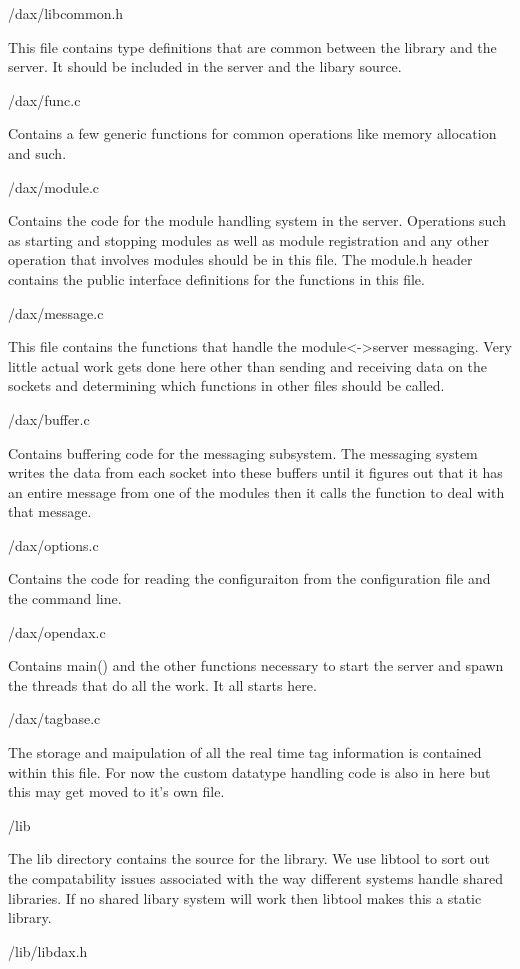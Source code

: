 \documentclass[10pt,letterpaper]{report}
\begin{document}
/dax/libcommon.h

This file contains type definitions that are common between the library and the server. It should be included in the server and the libary source.

/dax/func.c

Contains a few generic functions for common operations like memory allocation and such.

/dax/module.c

Contains the code for the module handling system in the server. Operations such as starting and stopping modules as well as module registration and any other operation that involves modules should be in this file. The module.h header contains the public interface definitions for the functions in this file.

/dax/message.c

This file contains the functions that handle the module<->server messaging. Very little actual work gets done here other than sending and receiving data on the sockets and determining which functions in other files should be called.

/dax/buffer.c

Contains buffering code for the messaging subsystem. The messaging system writes the data from each socket into these buffers until it figures out that it has an entire message from one of the modules then it calls the function to deal with that message.

/dax/options.c

Contains the code for reading the configuraiton from the configuration file and the command line.

/dax/opendax.c

Contains main() and the other functions necessary to start the server and spawn the threads that do all the work. It all starts here.

/dax/tagbase.c

The storage and maipulation of all the real time tag information is contained within this file. For now the custom datatype handling code is also in here but this may get moved to it's own file.

/lib

The lib directory contains the source for the library. We use libtool to sort out the compatability issues associated with the way different systems handle shared libraries. If no shared libary system will work then libtool makes this a static library.

/lib/libdax.h
\end{document}
